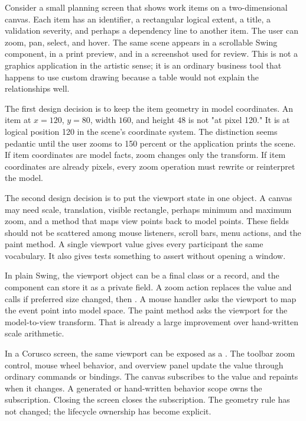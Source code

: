 Consider a small planning screen that shows work items on a two-dimensional canvas. Each item has an identifier, a rectangular logical extent, a title, a validation severity, and perhaps a dependency line to another item. The user can zoom, pan, select, and hover. The same scene appears in a scrollable Swing component, in a print preview, and in a screenshot used for review. This is not a graphics application in the artistic sense; it is an ordinary business tool that happens to use custom drawing because a table would not explain the relationships well.

The first design decision is to keep the item geometry in model coordinates. An item at \(x=120\), \(y=80\), width \(160\), and height \(48\) is not "at pixel 120." It is at logical position 120 in the scene's coordinate system. The distinction seems pedantic until the user zooms to 150 percent or the application prints the scene. If item coordinates are model facts, zoom changes only the transform. If item coordinates are already pixels, every zoom operation must rewrite or reinterpret the model.

The second design decision is to put the viewport state in one object. A canvas may need scale, translation, visible rectangle, perhaps minimum and maximum zoom, and a method that maps view points back to model points. These fields should not be scattered among mouse listeners, scroll bars, menu actions, and the paint method. A single viewport value gives every participant the same vocabulary. It also gives tests something to assert without opening a window.

In plain Swing, the viewport object can be a final class or a record, and the component can store it as a private field. A zoom action replaces the value and calls  if preferred size changed, then . A mouse handler asks the viewport to map the event point into model space. The paint method asks the viewport for the model-to-view transform. That is already a large improvement over hand-written scale arithmetic.

In a Corusco screen, the same viewport can be exposed as a . The toolbar zoom control, mouse wheel behavior, and overview panel update the value through ordinary commands or bindings. The canvas subscribes to the value and repaints when it changes. A generated or hand-written behavior scope owns the subscription. Closing the screen closes the subscription. The geometry rule has not changed; the lifecycle ownership has become explicit.

